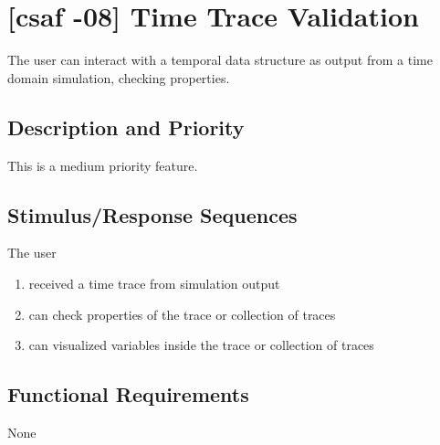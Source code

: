 \section{[\acrshort{csaf} -08] Time Trace Validation}

The user can interact with a temporal data structure as output from a time domain simulation, checking properties.

\subsection{Description and Priority}
This is a medium priority feature.

\subsection{Stimulus/Response Sequences}
The user
\begin{enumerate}
\item received a time trace from simulation output
\item can check properties of the trace or collection of traces
\item can visualized variables inside the trace or collection of traces
\end{enumerate}


\subsection{Functional Requirements}

None


